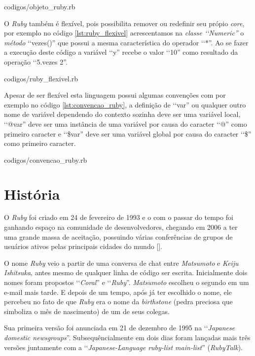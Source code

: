
{codigos/objeto_ruby.rb}

O \emph{Ruby} também é flexível, pois possibilita remover ou redefinir seu própio \emph{core}, por
exemplo no código \ref{lst:ruby_flexivel} acrescentamos na \emph{classe ‘‘Numeric''}
o \emph{método} ‘‘vezes()'' que possui a mesma característica do operador ‘‘*''. Ao se fazer a execução
deste código a variável ‘‘y'' recebe o valor ‘‘10'' como resultado da operação ‘‘5.vezes 2''.


{codigos/ruby_flexivel.rb}

Apesar de ser flexível esta linguagem possui algumas convenções com por exemplo no código
\ref{lst:convencao_ruby}, a definição de ‘‘var'' ou qualquer outro nome de
variável dependendo do contexto sozinha deve ser uma variável local, ‘‘@var'' deve ser uma instância
de uma variável por causa do caracter ‘‘@'' como primeiro caracter e ‘‘\$var'' deve ser uma variável global
por causa do caracter ‘‘\$'' como primeiro caracter.


{codigos/convencao_ruby.rb}

\section{História}
\label{história_ruby}

O \emph{Ruby} foi criado em 24 de fevereiro de 1993 e o com o passar do tempo foi ganhando espaço na
comunidade de desenvolvedores, chegando em 2006 a ter uma grande massa de aceitação, possuindo várias
conferências de grupos de usuários ativos pelas principais cidades do mundo [].

O nome \emph{Ruby} veio a partir de uma conversa de chat entre \emph{Matsumoto} e \emph{Keiju Ishitsuka},
antes mesmo de qualquer linha de código ser escrita. Inicialmente dois nomes foram propostos ‘‘\emph{Coral}''
e ‘‘\emph{Ruby}''. \emph{Matsumoto} escolheu o segundo em um e-mail mais tarde. E depois de um tempo, após
já ter escolhido o nome, ele percebeu no fato de que \emph{Ruby} era o nome da \emph{birthstone} (pedra
preciosa que simboliza o mês de nascimento) de um de seus colegas.

Sua primeira versão foi anunciada em 21 de dezembro de 1995 na ‘‘\emph{Japanese domestic newsgroups}''.
Subsequêncialmente em dois dias foram lançadas mais três versões juntamente com a
‘‘\emph{Japanese-Language ruby-list main-list}'' (\emph{RubyTalk}).

